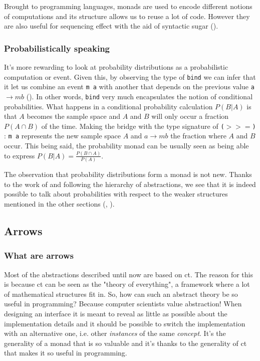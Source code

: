 \documentclass[
  oneside,
  11pt, a4paper,
  footinclude=true,
  headinclude=true,
  cleardoublepage=empty
]{scrbook}
\theoremstyle{definition}
\theoremstyle{definition}
\begin{document}
	            Brought to programming languages, monads are used to encode different notions of computations and its structure allows us to reuse a lot of code. However they are also useful for sequencing effect with the aid of syntactic sugar (\cite{wiki:xxx}).
	        
	        \subsubsection{Probabilistically speaking}
	            
	            It's more rewarding to look at probability distributions as a probabilistic computation or event. Given this, by observing the type of \texttt{bind} we can infer that it let us combine an event \texttt{m a} with another that depends on the previous value \texttt{a $\rightarrow m b$} (\cite{erwig_kollmansberger_2006}). In other words, \texttt{bind} very much encapsulates the notion of conditional probabilities. What happens in a conditional probability calculation $P(B|A)$ is that $A$ becomes the sample space and $A$ and $B$ will only occur a fraction $P(A \cap B)$ of the time. Making the bridge with the type signature of \texttt{($>>=$)} : \texttt{m a} represents the new sample space $A$ and \texttt{$a \rightarrow m b$} the fraction where $A$ and $B$ occur. This being said, the probability monad can be usually seen as being able to express $P(B|A) = \frac{P(B \cap A)}{P(A)}$. 
	            
	            The observation that probability distributions form a monad is not new. Thanks to the work of \cite{giry1982} and following the hierarchy of abstractions, we see that it is indeed possible to talk about probabilities with respect to the weaker structures mentioned in the other sections (\cite{jtobin}, \cite{Scibior19}).
	            
	    \subsection{Arrows}
	    
	        \subsubsection{What are arrows}
	        
    	        Most of the abstractions described until now are based on \gls{ct}. The reason for this is because \gls{ct} can be seen as the "theory of everything", a framework where a lot of mathematical structures fit in. So, how can such an abstract theory be so useful in programming? Because computer scientists value abstraction! When designing an interface it is meant to reveal as little as possible about the implementation details and it should be possible to switch the implementation with an alternative one, i.e. other \emph{instances} of the same \emph{concept}. It's the generality of a monad that is so valuable and it's thanks to the generality of \gls{ct} that makes it so useful in programming.
    	        
\end{document}
